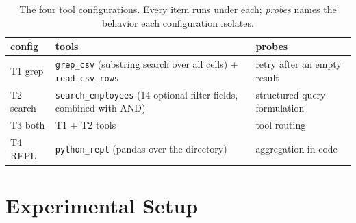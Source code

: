 \documentclass[11pt]{article}
\begin{document}
\begin{table}[t]
\centering
\small
\begin{tabular}{@{}p{1.25cm}p{2.9cm}p{2.5cm}@{}}
\toprule
\textbf{config} & \textbf{tools} & \textbf{probes} \\
\midrule
T1 grep & \texttt{grep\_csv} (substring search over all cells) + \texttt{read\_csv\_rows} & retry after an empty result \\
T2 search & \texttt{search\_employees} (14 optional filter fields, combined with AND) & structured-query formulation \\
T3 both & T1 + T2 tools & tool routing \\
T4 REPL & \texttt{python\_repl} (pandas over the directory) & aggregation in code \\
\bottomrule
\end{tabular}
\caption{The four tool configurations. Every item runs under each; \emph{probes} names the behavior each
configuration isolates.}
\label{tab:tools}
\end{table}

\section{Experimental Setup}

\begin{table}[t]
\centering
\footnotesize

\caption{Accuracy (\%) of the twelve model variants under the four tool configurations, with item-level
bootstrap 95\% CIs [lo--hi] (2{,}000 resamples) over all 626 items. Best per column in \textbf{bold}.
$^{\dagger}$GPT-5.5 search-tool loop (Section~\ref{sec:results}).}
\label{tab:leaderboard}
\end{table}
\end{document}
